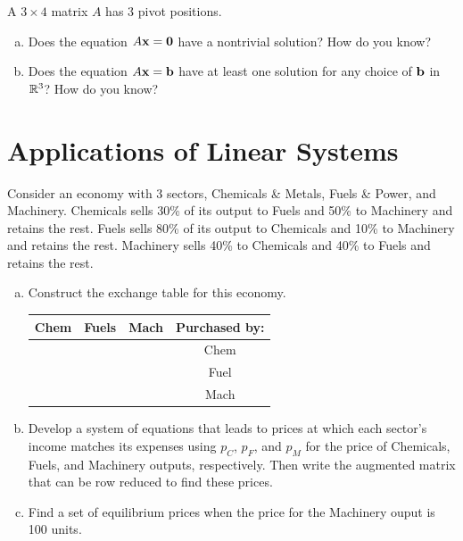 \begin{exercise} %
	A $3\times 4$ matrix $A$ has 3 pivot positions.
	\begin{multicols}{2}
		\begin{enumerate}[(a)]
			\item Does the equation $A\boldsymbol{\mathbf{x}}=\boldsymbol{\mathbf{0}}$ have a nontrivial solution? How do you know?
			\item Does the equation $A\boldsymbol{\mathbf{x}}=\boldsymbol{\mathbf{b}}$ have at least one solution for any choice of $\boldsymbol{\mathbf{b}}$ in $\mathbb{R}^3$? How do you know?
		\end{enumerate}
	\end{multicols}
\end{exercise}
\vfill


\newpage


\section{Applications of Linear Systems}
\names[4]


\begin{exercise} %
	Consider an economy with 3 sectors, Chemicals \& Metals, Fuels \& Power, and Machinery. Chemicals sells 30\% of its output to Fuels and 50\% to Machinery and retains the rest. Fuels sells 80\% of its output to Chemicals and 10\% to Machinery and retains the rest. Machinery sells 40\% to Chemicals and 40\% to Fuels and retains the rest.
	\begin{enumerate}[(a)]
		\item Construct the exchange table for this economy. \par
			\renewcommand{\arraystretch}{2}
			\begin{tabular}{|c|c|c|c|}
				\hline
				\textbf{Chem}	& \textbf{Fuels}	& \textbf{Mach}	& \textbf{Purchased by:} \\ \hline
				&	&	& Chem \\ \hline
				&	&	& Fuel \\ \hline
				&	&	& Mach \\ \hline
			\end{tabular}
		\item Develop a system of equations that leads to prices at which each sector's income matches its expenses using $p_C$, $p_F$, and $p_M$ for the price of Chemicals, Fuels, and Machinery outputs, respectively. Then write the augmented matrix that can be row reduced to find these prices.
		\vfill
		\item Find a set of equilibrium prices when the price for the Machinery ouput is 100 units.
		\vfill
	\end{enumerate}
\end{exercise}


